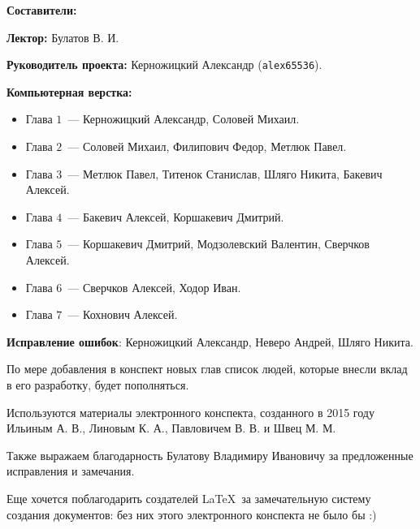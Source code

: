 \documentclass[../main.tex]{subfiles}
\begin{document}
{\Huge \bf Составители:}

\vspace{2em}

{
    \textbf{Лектор:} Булатов В. И.
    
    \smallskip
    
    \textbf{Руководитель проекта:} Керножицкий Александр 
    (\texttt{alex65536}).
    
    \smallskip
    
    \textbf{Компьютерная верстка:}
    \begin{itemize}
     \item Глава $1$~--- Керножицкий Александр, Соловей Михаил.
     \item Глава $2$~--- Соловей Михаил, Филипович Федор, Метлюк 
     Павел.
     \item Глава $3$~--- Метлюк Павел, Титенок Станислав, Шляго 
     Никита, Бакевич Алексей.
     \item Глава $4$~--- Бакевич Алексей, Коршакевич Дмитрий.
     \item Глава $5$~--- Коршакевич Дмитрий, Модзолевский 
     Валентин, Сверчков Алексей.
     \item Глава $6$~--- Сверчков Алексей, Ходор Иван.
     \item Глава $7$~--- Кохнович Алексей.
    \end{itemize}
    
    \textbf{Исправление ошибок}: Керножицкий Александр, Неверо 
    Андрей, Шляго Никита.
    
    \medskip
    
    По мере добавления в конспект новых глав список людей, которые 
    внесли вклад в его разработку, будет пополняться.
    
    \vspace{1.5em}
    
    Используются материалы электронного конспекта, созданного в 
    2015 году Ильиным А. В., Линовым К. А., Павловичем В. В. и 
    Швец М. М.

    \smallskip
    
    Также выражаем благодарность Булатову Владимиру Ивановичу за 
    предложенные исправления и замечания.
    
    \smallskip
    
    Еще хочется поблагодарить создателей \LaTeX\ за замечательную 
    систему создания документов: без них этого электронного 
    конспекта не было бы :)
}

\pagebreak
\end{document}
